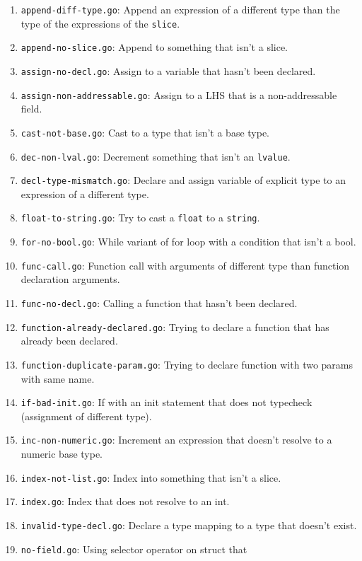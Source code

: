 \documentclass[11pt]{article}
\begin{document}
\begin{enumerate}
\item \texttt{append-diff-type.go}: Append an expression of a
  different type than the type of the expressions of the
  \texttt{slice}.
\item \texttt{append-no-slice.go}: Append to something that isn't a
  slice.
\item \texttt{assign-no-decl.go}: Assign to a variable that hasn't
  been declared.
\item \texttt{assign-non-addressable.go}: Assign to a LHS that is a
  non-addressable field.
\item \texttt{cast-not-base.go}: Cast to a type that isn't a base
  type.
\item \texttt{dec-non-lval.go}: Decrement something that isn't an
  \texttt{lvalue}.
\item \texttt{decl-type-mismatch.go}: Declare and assign variable of
  explicit type to an expression of a different type.
\item \texttt{float-to-string.go}: Try to cast a \texttt{float} to a
  \texttt{string}.
\item \texttt{for-no-bool.go}: While variant of for loop with a
  condition that isn't a bool.
\item \texttt{func-call.go}: Function call with arguments of
  different type than function declaration arguments.
\item \texttt{func-no-decl.go}: Calling a function that hasn't been
  declared.
\item \texttt{function-already-declared.go}: Trying to declare a
  function that has already been declared.
\item \texttt{function-duplicate-param.go}: Trying to declare
  function with two params with same name.
\item \texttt{if-bad-init.go}: If with an init statement that does
  not typecheck (assignment of different type).
\item \texttt{inc-non-numeric.go}: Increment an expression that
  doesn't resolve to a numeric base type.
\item \texttt{index-not-list.go}: Index into something that isn't a
  slice.
\item \texttt{index.go}: Index that does not resolve to an int.
\item \texttt{invalid-type-decl.go}: Declare a type mapping to a
  type that doesn't exist.
\item \texttt{no-field.go}: Using selector operator on struct that

\end{enumerate}
\end{document}
